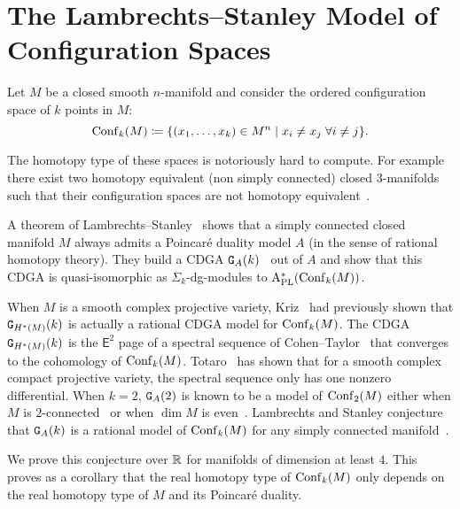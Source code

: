 \chapter{The Lambrechts--Stanley Model of Configuration Spaces}
\label{chap.2}

Let $M$ be a closed smooth $n$-manifold and consider the ordered configuration space of $k$ points in $M$:
\[ \operatorname{Conf}_{k}(M) \coloneqq \{ (x_{1}, \dots, x_{k}) \in M^{n} \mid x_{i} \neq x_{j} \; \forall i \neq j \}. \]

The homotopy type of these spaces is notoriously hard to compute.
For example there exist two homotopy equivalent (non simply connected) closed $3$-manifolds such that their configuration spaces are not homotopy equivalent~\cite{LongoniSalvatore2005}.

A theorem of Lambrechts--Stanley~\cite{LambrechtsStanley2008} shows that a simply connected closed manifold $M$ always admits a Poincaré duality model $A$ (in the sense of rational homotopy theory).
They build a CDGA $\mathtt{G}_{A}(k)$~\cite{LambrechtsStanley2008a} out of $A$ and show that this CDGA is quasi-isomorphic as $\Sigma_{k}$-dg-modules to $\mathrm{A}^{*}_{\mathrm{PL}}(\operatorname{Conf}_{k}(M))$.

When $M$ is a smooth complex projective variety, Kriz~\cite{Kriz1994} had previously shown that $\mathtt{G}_{H^{*}(M)}(k)$ is actually a rational CDGA model for $\operatorname{Conf}_{k}(M)$.
The CDGA $\mathtt{G}_{H^{*}(M)}(k)$ is the $\mathsf{E}^{2}$ page of a spectral sequence of Cohen--Taylor~\cite{CohenTaylor1978} that converges to the cohomology of $\operatorname{Conf}_{k}(M)$.
Totaro~\cite{Totaro1996} has shown that for a smooth complex compact projective variety, the spectral sequence only has one nonzero differential.
When $k = 2$, $\mathtt{G}_{A}(2)$ is known to be a model of $\operatorname{Conf}_{2}(M)$ either when $M$ is $2$-connected~\cite{LambrechtsStanley2004} or when $\dim M$ is even~\cite{CordovaBulens2015}.
Lambrechts and Stanley conjecture that $\mathtt{G}_{A}(k)$ is a rational model of $\operatorname{Conf}_{k}(M)$ for any simply connected manifold~\cite{LambrechtsStanley2008}.

We prove this conjecture over $\mathbb{R}$ for manifolds of dimension at least $4$.
This proves as a corollary that the real homotopy type of $\operatorname{Conf}_{k}(M)$ only depends on the real homotopy type of $M$ and its Poincaré duality.

